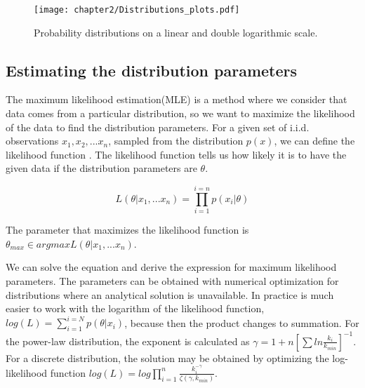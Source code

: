 \begin{figure}[!h]
	\centering
	\texttt{[image: chapter2/Distributions\_plots.pdf]}
	\caption{Probability distributions on a linear and double logarithmic scale.}
	\label{fig:distributions}
\end{figure}


\subsection{Estimating the distribution parameters}

The maximum likelihood estimation(MLE) is a method where we consider that data comes from a particular distribution, so we want to maximize the likelihood of the data to find the distribution parameters. For a given set of i.i.d. observations $x_1, x_2, ...x_n$, sampled from the distribution $p(x)$, we can define the likelihood function  \cite{nair2022fundamentals}. The likelihood function tells us how likely it is to have the given data if the distribution parameters are $\theta$. 

\begin{equation}
L (\theta| x_1, ... x_n) = \prod_{i=1}^{i=n} p(x_i | \theta)
\end{equation}

The parameter that maximizes the likelihood function is $\theta_{max} \in arg max L(\theta| x_1,... x_n)$.

We can solve the equation and derive the expression for maximum likelihood parameters. The parameters can be obtained with numerical optimization for distributions where an analytical solution is unavailable. In practice is much easier to work with the logarithm of the likelihood function, $log(L) = \sum_{i=1}^{i=N} p(\theta| x_i)$, because then the product changes to summation. For the power-law distribution, the exponent is calculated as  
$\gamma = 1+n[\sum ln \frac{k_i}{k_{min}} ]^{-1}$. For a discrete distribution, the solution may be obtained by optimizing the log-likelihood function $log(L) = log\prod_{i=1}^{n} \frac{k_i^{-\gamma}}{\zeta(\gamma, k_{min})}$.

